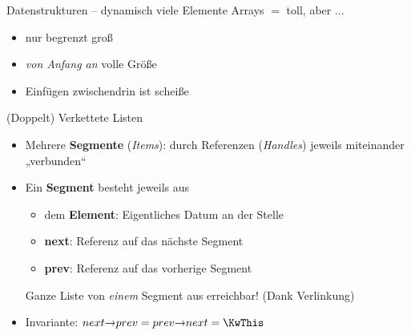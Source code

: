 




	
	
	
\begin{frame}{Datenstrukturen – dynamisch viele Elemente}
	Arrays $=$ toll, aber ...
		\pause
		\begin{itemize}
			\item[\Cons] nur begrenzt groß
			\pause
			\item[\Cons] \emph{von Anfang an} volle Größe
			\pause
			\item[\Cons] Einfügen zwischendrin ist scheiße
		\end{itemize}
\end{frame}

\begin{frame}{(Doppelt) Verkettete Listen}
	\begin{itemize}
		\item Mehrere \textbf{Segmente} (\emph{Items}): durch Referenzen  (\emph{Handles}) jeweils miteinander „verbunden“
		\pause
		\item Ein \textbf{Segment} besteht jeweils aus
		\begin{itemize}
			\item dem \textbf{Element}: Eigentliches Datum an der Stelle
			\pause
			\item \textbf{next}: Referenz auf das nächste Segment
			\pause
			\item \textbf{prev}: Referenz auf das vorherige Segment
		\end{itemize}
		\pause
		\implitem Ganze Liste von \textit{einem} Segment aus erreichbar! (Dank Verlinkung)
		\pause 
		\item Invariante: $next \access prev = prev \access next = \KwThis$
	\end{itemize}
\end{frame}

